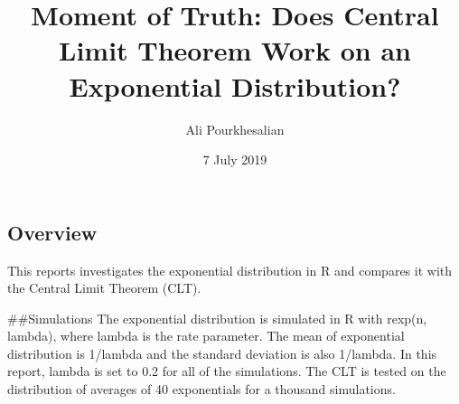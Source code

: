 \documentclass[]{article}
\title{Moment of Truth: Does Central Limit Theorem Work on an Exponential
Distribution?}
\author{Ali Pourkhesalian}
\date{7 July 2019}
\begin{document}
\maketitle

\hypertarget{overview}{%
\subsection{Overview}\label{overview}}

This reports investigates the exponential distribution in R and compares
it with the Central Limit Theorem (CLT).

\#\#Simulations The exponential distribution is simulated in R with
rexp(n, lambda), where lambda is the rate parameter. The mean of
exponential distribution is 1/lambda and the standard deviation is also
1/lambda. In this report, lambda is set to 0.2 for all of the
simulations. The CLT is tested on the distribution of averages of 40
exponentials for a thousand simulations.
\end{document}
